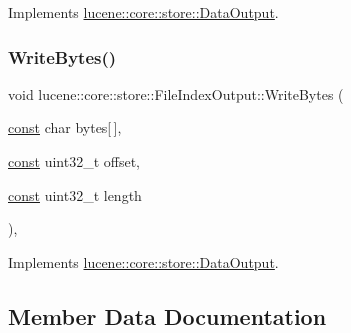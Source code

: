 Implements \mbox{\hyperlink{classlucene_1_1core_1_1store_1_1DataOutput_a22e242cc11ebfc3e7937eacb07106626}{lucene\+::core\+::store\+::\+Data\+Output}}.

\mbox{\label{classlucene_1_1core_1_1store_1_1FileIndexOutput_a7f627b777857d45398afc0b740f036ff}} 
\subsubsection{\texorpdfstring{Write\+Bytes()}{WriteBytes()}}
{\footnotesize\ttfamily void lucene\+::core\+::store\+::\+File\+Index\+Output\+::\+Write\+Bytes (\begin{DoxyParamCaption}\item[{\mbox{\hyperlink{ZlibCrc32_8h_a2c212835823e3c54a8ab6d95c652660e}{const}} char}]{bytes\mbox{[}$\,$\mbox{]},  }\item[{\mbox{\hyperlink{ZlibCrc32_8h_a2c212835823e3c54a8ab6d95c652660e}{const}} uint32\+\_\+t}]{offset,  }\item[{\mbox{\hyperlink{ZlibCrc32_8h_a2c212835823e3c54a8ab6d95c652660e}{const}} uint32\+\_\+t}]{length }\end{DoxyParamCaption})\hspace{0.3cm}{\ttfamily [inline]}, {\ttfamily [virtual]}}



Implements \mbox{\hyperlink{classlucene_1_1core_1_1store_1_1DataOutput_ab2d4f729a14d87afd84ec558e11883d2}{lucene\+::core\+::store\+::\+Data\+Output}}.



\subsection{Member Data Documentation}
\mbox{\label{classlucene_1_1core_1_1store_1_1FileIndexOutput_a31edcce20628b85549a8459e6da1f614}} 
